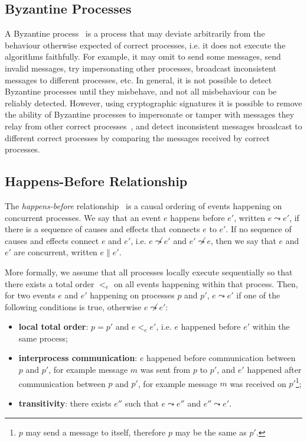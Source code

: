 \documentclass[9pt, oneside]{article}   	%
\begin{document}
\subsection{Byzantine Processes}

A Byzantine process~\cite{lamport2019byzantinegenerals} is a process that may deviate arbitrarily from the behaviour otherwise expected of correct processes, i.e. it does not execute the algorithms faithfully. For example, it may omit to send some messages, send invalid messages, try impersonating other processes, broadcast inconsistent messages to different processes, etc. In general, it is not possible to detect Byzantine processes until they misbehave, and not all misbehaviour can be reliably detected. However, using cryptographic signatures it is possible to remove the ability of Byzantine processes to impersonate or tamper with messages they relay from other correct processes~\cite{lamport2019byzantinegenerals}, and detect inconsistent messages broadcast to different correct processes by comparing the messages received by correct processes.

\subsection{Happens-Before Relationship}
\label{sec:background:happens-before}

The \textit{happens-before} relationship~\cite{lamport2019time} is a causal ordering of events happening on concurrent processes. We say that an event $e$ happens before $e'$, written $e \leadsto e'$, if there is a sequence of causes and effects that connects $e$ to $e'$. If no sequence of causes and effects connect $e$ and $e'$, i.e. $e \not\leadsto e'$ and $e' \not\leadsto e$, then we say that $e$ and $e'$ are concurrent, written $e \parallel e'$.

More formally, we assume that all processes locally execute sequentially so that there exists a total order $<_e$ on all events happening within that process. Then, for two events $e$ and $e'$ happening on processes $p$ and $p'$, $e \leadsto e'$ if one of the following conditions is true, otherwise $e \not\leadsto e'$:
\begin{itemize}
	\item \textbf{local total order}: $p=p'$ and $e <_e e'$, i.e. $e$ happened before $e'$ within the same process;
	\item \textbf{interprocess communication}: $e$ happened before communication between $p$ and $p'$, for example message $m$ was sent from $p$ to $p'$, and $e'$ happened after communication between $p$ and $p'$, for example message $m$ was received on $p'$\footnote{$p$ may send a message to itself, therefore $p$ may be the same as $p'$.};
	\item \textbf{transitivity}: there exists $e''$ such that $e \leadsto e''$ and $e'' \leadsto e'$.
\end{itemize}
\end{document}
